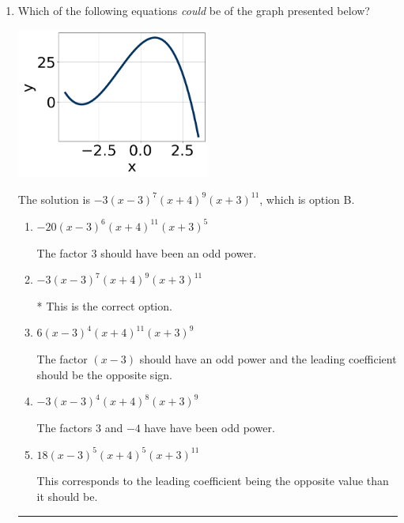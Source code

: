 \documentclass{extbook}[14pt]
\newcommand{\litem}[1]{\item #1

\rule{\textwidth}{0.4pt}}
\begin{document}
\begin{enumerate}\litem{
Which of the following equations \textit{could} be of the graph presented below?

\begin{center}
    \includegraphics[width=0.5\textwidth]{../Figures/polyGraphToFunctionB.png}
\end{center}


The solution is \( -3(x - 3)^{7} (x + 4)^{9} (x + 3)^{11} \), which is option B.\begin{enumerate}[label=\Alph*.]
\item \( -20(x - 3)^{6} (x + 4)^{11} (x + 3)^{5} \)

The factor $3$ should have been an odd power.
\item \( -3(x - 3)^{7} (x + 4)^{9} (x + 3)^{11} \)

* This is the correct option.
\item \( 6(x - 3)^{4} (x + 4)^{11} (x + 3)^{9} \)

The factor $(x - 3)$ should have an odd power and the leading coefficient should be the opposite sign.
\item \( -3(x - 3)^{4} (x + 4)^{8} (x + 3)^{9} \)

The factors $3$ and $-4$ have have been odd power.
\item \( 18(x - 3)^{5} (x + 4)^{5} (x + 3)^{11} \)

This corresponds to the leading coefficient being the opposite value than it should be.
\end{enumerate}

}
\end{enumerate}
\end{document}
